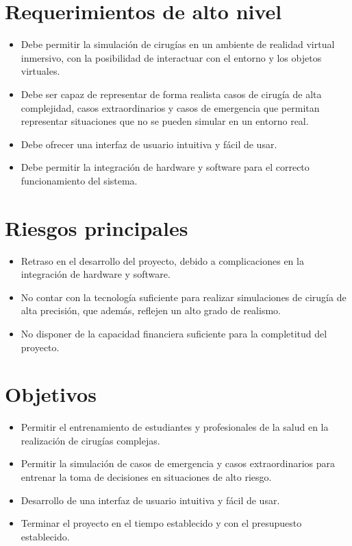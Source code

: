   \section{Requerimientos de alto nivel}
  \begin{itemize}
    \item Debe permitir la simulación de cirugías en un ambiente de realidad virtual inmersivo, con la posibilidad de interactuar con el entorno y los objetos virtuales.
    \item Debe ser capaz de representar de forma realista casos de cirugía de alta complejidad, casos extraordinarios y casos de emergencia que permitan
    representar situaciones que no se pueden simular en un entorno real.
    \item Debe ofrecer una interfaz de usuario intuitiva y fácil de usar.
    \item Debe permitir la integración de hardware y software para el
    correcto funcionamiento del sistema.
  \end{itemize}
  \section{Riesgos principales}
  \begin{itemize}
    \item Retraso en el desarrollo del proyecto, debido a complicaciones en la integración de hardware y software.
    \item No contar con la tecnología suficiente para realizar simulaciones de
    cirugía de alta precisión, que además, reflejen un alto grado de realismo.
    \item No disponer de la capacidad financiera suficiente para la completitud
    del proyecto.
  \end{itemize}

  \section{Objetivos}
  \begin{itemize}
    \item Permitir el entrenamiento de estudiantes y profesionales de la salud en la realización de cirugías complejas.
    \item Permitir la simulación de casos de emergencia y casos extraordinarios para entrenar la toma de decisiones en situaciones de alto riesgo.
    \item Desarrollo de una interfaz de usuario intuitiva y fácil de usar.
    \item Terminar el proyecto en el tiempo establecido y con el presupuesto
    establecido.
  \end{itemize}

